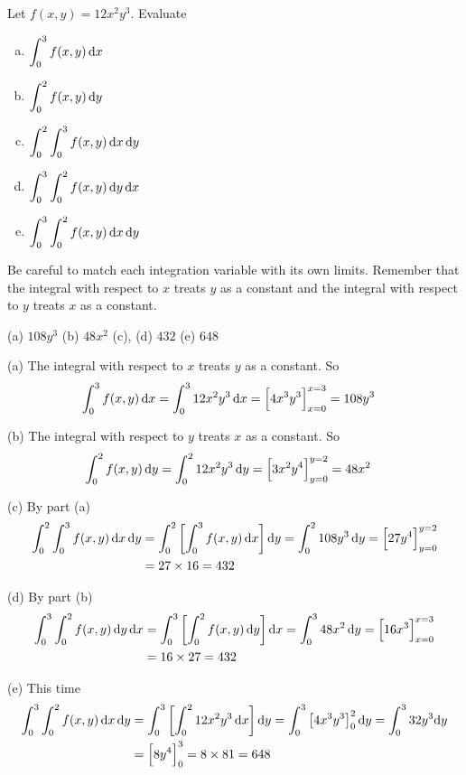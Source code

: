 \begin{question}
Let $f(x,y)= 12 x^2y^3$. Evaluate
\begin{enumerate}[(a)]
\item
$\displaystyle\int_0^3 f(x,y)\,\mathrm{d}x$
\item
$\displaystyle\int_0^2 f(x,y)\,\mathrm{d}y$
\item
$\displaystyle\int_0^2\int_0^3 f(x,y)\,\mathrm{d}x\,\mathrm{d}y$
\item
$\displaystyle\int_0^3\int_0^2 f(x,y)\,\mathrm{d}y\,\mathrm{d}x$
\item
$\displaystyle\int_0^3\int_0^2 f(x,y)\,\mathrm{d}x\,\mathrm{d}y$
\end{enumerate}
\end{question}

\begin{hint}
Be careful to match each integration variable with its own limits.
Remember that the integral with respect to $x$ treats $y$ as a constant and 
the integral with respect to $y$ treats $x$ as a constant.
\end{hint}

\begin{answer}
(a) $108 y^3$\qquad
(b) $48x^2$\qquad
(c), (d) $432$\qquad
(e) $648$
\end{answer}

\begin{solution}
(a) The integral with respect to $x$ treats $y$ as a constant. So
\begin{align*}
\int_0^3 f(x,y)\,\mathrm{d}x
  &= \int_0^3 12 x^2y^3\,\mathrm{d}x
   = \Big[4x^3y^3\Big]_{x=0}^{x=3}
   = 108 y^3
\end{align*}

(b) The integral with respect to $y$ treats $x$ as a constant. So
\begin{align*}
\int_0^2 f(x,y)\,\mathrm{d}y
  &= \int_0^2 12 x^2y^3\,\mathrm{d}y
   = \Big[3x^2y^4\Big]_{y=0}^{y=2}
   = 48x^2
\end{align*}

(c) By part (a)
\begin{align*}
\int_0^2\int_0^3 f(x,y)\,\mathrm{d}x\,\mathrm{d}y
&=\int_0^2\left[\int_0^3 f(x,y)\,\mathrm{d}x\right]\mathrm{d}y
 =\int_0^2 108y^3\,\mathrm{d}y
 =\Big[27y^4\Big]_{y=0}^{y=2} \\
&=27\times 16 
= 432
\end{align*}

(d) By part (b)
\begin{align*}
\int_0^3\int_0^2 f(x,y)\,\mathrm{d}y\,\mathrm{d}x
&=\int_0^3\left[\int_0^2 f(x,y)\,\mathrm{d}y\right]\mathrm{d}x
 =\int_0^3 48x^2\,\mathrm{d}y
 =\Big[16x^3\Big]_{x=0}^{x=3} \\
&=16\times 27 
= 432
\end{align*}

(e) This time
\begin{align*}
\int_0^3\int_0^2 f(x,y)\,\mathrm{d}x\,\mathrm{d}y
&=\int_0^3\left[\int_0^2 12 x^2y^3\,\mathrm{d}x\right]\mathrm{d}y
=\int_0^3\left[4 x^3y^3\right]_0^2\mathrm{d}y
=\int_0^3 32 y^3\mathrm{d}y \\
& =\Big[8y^4\Big]_0^3 
 =8\times 81
 = 648
\end{align*}

\end{solution}


